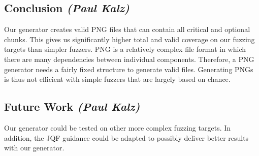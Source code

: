 \documentclass[runningheads]{llncs}
\begin{document}
\subsection{Conclusion \normalfont\textit{(Paul Kalz)}}
Our generator creates valid PNG files that can contain all critical and optional chunks. This gives us significantly higher total and valid coverage on our fuzzing targets than simpler fuzzers. PNG is a relatively complex file format in which there are many dependencies between individual components. Therefore, a PNG generator needs a fairly fixed structure to generate valid files. Generating PNGs is thus not efficient with simple fuzzers that are largely based on chance.

\subsection{Future Work \normalfont\textit{(Paul Kalz)}}
Our generator could be tested on other more complex fuzzing targets. In addition, the JQF guidance could be adapted to possibly deliver better results with our generator.
\end{document}
